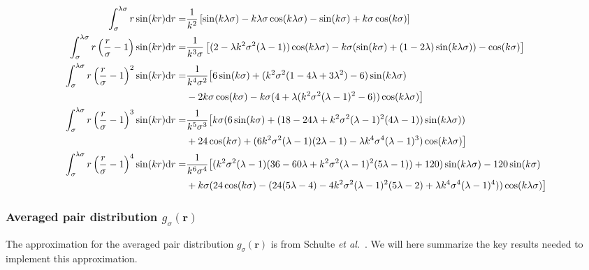 \documentclass[letterpaper,twocolumn,amsmath,amssymb,pre,aps,10pt]{revtex4-1}
\newcommand\rr{\mathbf{r}}
\begin{document}
\begin{widetext}
\begin{align}
  \int_\sigma^{\lambda \sigma} r \sin (kr) \mathrm{d}r =&
  \frac{1}{k^2}\left[ \sin (k\lambda\sigma) - k\lambda\sigma
    \cos (k\lambda\sigma) - \sin (k\sigma) + k\sigma \cos (k\sigma) \right]\\
  \int_\sigma^{\lambda \sigma} r
 \left( \frac{r}{\sigma}-1\right) \sin (kr) \mathrm{d}r =&
 \frac{1}{k^3 \sigma}\left[(2-\lambda k^2
 \sigma^2(\lambda-1))\cos(k\lambda\sigma)-k\sigma(\sin(k\sigma)
 +(1-2\lambda) \sin(k\lambda\sigma)) -\cos(k\sigma) \right] \\
  \int_\sigma^{\lambda \sigma} r
 \left( \frac{r}{\sigma}-1\right)^2 \sin (kr) \mathrm{d}r =&
 \frac{1}{k^4\sigma^2} \big[
 6\sin(k\sigma)+(k^2\sigma^2(1-4\lambda+3\lambda^2)
 -6)\sin(k\lambda\sigma) \notag \\
 &-2k\sigma\cos(k\sigma) - k\sigma(4 +
 \lambda(k^2\sigma^2(\lambda-1)^2 - 6))\cos(k\lambda\sigma)\big] \\
  \int_\sigma^{\lambda \sigma} r
 \left( \frac{r}{\sigma}-1\right)^3 \sin (kr) \mathrm{d}r =&
 \frac{1}{k^5\sigma^3} \big[k\sigma(6\sin(k\sigma) + (18-24\lambda
   +k^2\sigma^2(\lambda-1)^2(4\lambda-1))\sin(k\lambda\sigma)) \notag \\
   &+24\cos(k\sigma) + (6k^2\sigma^2(\lambda-1)(2\lambda-1)-\lambda
   k^4\sigma^4(\lambda-1)^3)\cos(k\lambda\sigma)\big] \\
  \int_\sigma^{\lambda \sigma} r
 \left( \frac{r}{\sigma}-1\right)^4 \sin (kr) \mathrm{d}r =&
 \frac{1}{k^6\sigma^4}
 \big[(k^2\sigma^2(\lambda-1)(36-60\lambda+k^2\sigma^2(\lambda - 1)^2(5\lambda-1))
   + 120)\sin(k\lambda\sigma) - 120\sin(k\sigma) \notag \\
   &+k\sigma(24\cos(k\sigma) -
   (24(5\lambda-4)-4k^2\sigma^2(\lambda-1)^2 (5\lambda-2) +
   \lambda k^4\sigma^4(\lambda-1)^4))\cos(k\lambda\sigma) \big]
\end{align}
\end{widetext}
\subsubsection{Averaged pair distribution  $g_\sigma(\rr)$}

The approximation for the averaged pair distribution $g_\sigma(\rr)$
is from Schulte \emph{et al.}~\cite{schulte2012using}.  We will here
summarize the key results needed to implement this approximation.

\end{document}
